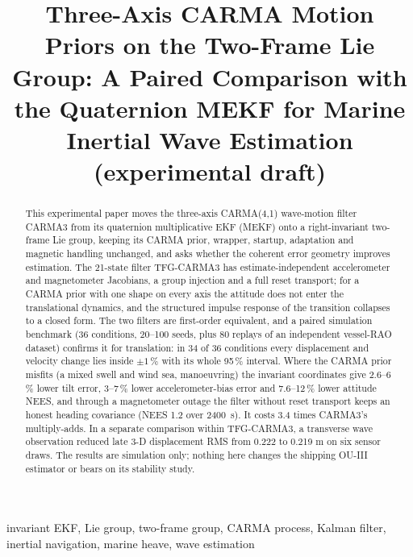 \documentclass[conference]{IEEEtran}
\title{Three-Axis CARMA Motion Priors on the Two-Frame Lie Group:
A Paired Comparison with the Quaternion MEKF for Marine Inertial Wave
Estimation (experimental draft)}
\author{%
  \IEEEauthorblockN{Mikhail S. Grushinskiy}
  \IEEEauthorblockA{Independent Researcher, USA, Fair Lawn\\
  Bareboat Necessities GitHub Project\\
  Email: mgrouch@users.github.com}%
}
\theoremstyle{bodysmall}
\begin{document}
\maketitle

\begin{abstract}
This experimental paper moves the three-axis CARMA(4,1) wave-motion filter
CARMA3 from its quaternion multiplicative EKF (MEKF) onto a right-invariant
two-frame Lie group, keeping its CARMA prior, wrapper, startup, adaptation and
magnetic handling unchanged, and asks whether the coherent error geometry
improves estimation. The 21-state filter TFG-CARMA3 has estimate-independent
accelerometer and magnetometer Jacobians, a group injection and a full reset
transport; for a CARMA prior with one shape on every axis the attitude does
not enter the translational dynamics, and the structured impulse response of
the transition collapses to a closed form. The two filters are first-order
equivalent, and a paired simulation benchmark (36 conditions, 20--100 seeds,
plus 80 replays of an independent vessel-RAO dataset) confirms it for
translation: in 34 of 36 conditions every displacement and velocity change
lies inside $\pm1\,\%$ with its whole 95\,\% interval. Where the CARMA prior
misfits (a mixed swell and wind sea, manoeuvring) the invariant coordinates
give 2.6--6\,\% lower tilt error, 3--7\,\% lower accelerometer-bias error and
7.6--12\,\% lower attitude NEES, and through a magnetometer outage the filter
without reset transport keeps an honest heading covariance (NEES 1.2 over
\SI{2400}{s}). It costs 3.4 times CARMA3's multiply-adds. In a separate comparison
within TFG-CARMA3, a transverse wave observation reduced late 3-D
displacement RMS from 0.222 to 0.219 m on six sensor draws. The results are
simulation only; nothing here changes the shipping OU-III estimator or bears
on its stability study.
\end{abstract}


\begin{IEEEkeywords}
invariant EKF, Lie group, two-frame group, CARMA process, Kalman filter,
inertial navigation, marine heave, wave estimation
\end{IEEEkeywords}
\end{document}
